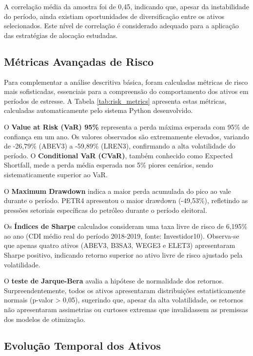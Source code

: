 A correlação média da amostra foi de 0,45, indicando que, apesar da instabilidade do período, ainda existiam oportunidades de diversificação entre os ativos selecionados. Este nível de correlação é considerado adequado para a aplicação das estratégias de alocação estudadas.

\subsection{Métricas Avançadas de Risco}

Para complementar a análise descritiva básica, foram calculadas métricas de risco mais sofisticadas, essenciais para a compreensão do comportamento dos ativos em períodos de estresse. A Tabela \ref{tab:risk_metrics} apresenta estas métricas, calculadas automaticamente pelo sistema Python desenvolvido.



O \textbf{Value at Risk (VaR) 95\%} representa a perda máxima esperada com 95\% de confiança em um ano. Os valores observados são extremamente elevados, variando de -26,79\% (ABEV3) a -59,89\% (LREN3), confirmando a alta volatilidade do período. O \textbf{Conditional VaR (CVaR)}, também conhecido como Expected Shortfall, mede a perda média esperada nos 5\% piores cenários, sendo sistematicamente superior ao VaR.

O \textbf{Maximum Drawdown} indica a maior perda acumulada do pico ao vale durante o período. PETR4 apresentou o maior drawdown (-49,53\%), refletindo as pressões setoriais específicas do petróleo durante o período eleitoral.

Os \textbf{Índices de Sharpe} calculados consideram uma taxa livre de risco de 6,195\% ao ano (CDI médio real do período 2018-2019, fonte: Investidor10). Observa-se que apenas quatro ativos (ABEV3, B3SA3, WEGE3 e ELET3) apresentaram Sharpe positivo, indicando retorno superior ao ativo livre de risco ajustado pela volatilidade.

O \textbf{teste de Jarque-Bera} avalia a hipótese de normalidade dos retornos. Surpreendentemente, todos os ativos apresentaram distribuições estatisticamente normais (p-valor > 0,05), sugerindo que, apesar da alta volatilidade, os retornos não apresentaram assimetrias ou curtoses extremas que invalidassem as premissas dos modelos de otimização.

\subsection{Evolução Temporal dos Ativos}

